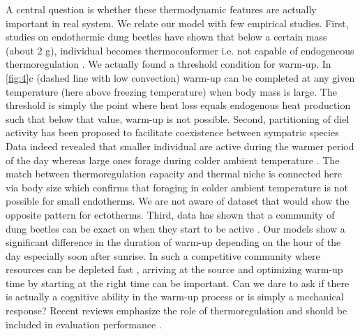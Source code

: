 A central question is whether these thermodynamic features are actually important in real system.  
We relate our model with few empirical studies.
First, studies on endothermic dung beetles have shown that below a certain mass (about 2 g), individual becomes thermoconformer i.e. not capable of endogeneous thermoregulation \citep{Bartholomew1978, Verdu2006}.
We actually found a threshold condition for warm-up.
In \cref{fig:4}c (dashed line with low convection) warm-up can be completed at any given temperature (here above freezing temperature) when body mass is large.
The threshold is simply the point where heat loss equals endogenous heat production such that  below that value, warm-up is not possible.
Second, partitioning of diel activity has been proposed to facilitate coexistence between sympatric species \citep{Viljanen2009}
Data indeed revealed that smaller  individual are active during the warmer period of the day whereas large ones forage during colder ambient temperature \citep{May1985}.
The match between thermoregulation capacity and thermal niche is connected here via body size which confirms that foraging in colder ambient temperature is not possible for small endotherms.
We are not aware of dataset that would show the opposite pattern for ectotherms. %
Third, data has shown that a community of dung beetles can be exact on when they start to be active \citep[e.g.,][]{Halffter1966, Caveney1995}.
Our models show a significant difference in the duration of warm-up depending on the hour of the day especially soon after sunrise.
In such a competitive community where resources can be depleted fast \citep{Hanski1991}, arriving at the source and optimizing warm-up time by starting at the right time can be important.
Can we dare to ask if there is actually a cognitive ability in the warm-up process or is simply a mechanical response?  %
Recent reviews emphasize the role of thermoregulation and should be included in evaluation performance \citep{Dial2008, Kalinkat2015}.


